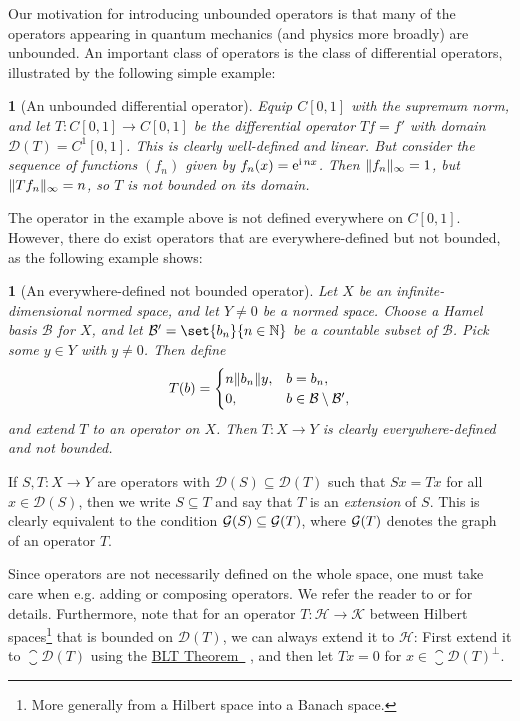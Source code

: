 \documentclass[article, a4paper, 11pt, oneside]{memoir}
\makeatletter
\numberwithin{equation}{chapter}
\newcommand{\calH}{\mathcal{H}}
\newcommand{\calK}{\mathcal{K}}
\newcommand{\calB}{\mathcal{B}}
\newcommand{\dom}{\mathcal{D}}
\theoremstyle{myexample}
\theoremstyle{myexample}
\theoremstyle{myexamplebreak}
\theoremstyle{myexamplebreak}
\newtheorem{examplebreak}[theorem]{\protect\@example}
\theoremstyle{nonumberplain}
\theoremstyle{MyNonumberplain}
\newcommand{\mynameref}[2]{%
    \hyperref[#1]{#2~\labelcref*{#1}}%
}
\newcommand{\@example}{}
\renewcommand{\@example}{Example}%
\renewcommand{\@example}{Eksempel}%
\makeatother
\begin{document}
Our motivation for introducing unbounded operators is that many of the operators appearing in quantum mechanics (and physics more broadly) are unbounded. An important class of operators is the class of differential operators, illustrated by the following simple example:
%
\begin{examplebreak}[An unbounded differential operator]
    Equip $C[0,1]$ with the supremum norm, and let $T \colon C[0,1] \to C[0,1]$ be the differential operator $Tf = f'$ with domain $\dom(T) = C^1[0,1]$. This is clearly well-defined and linear. But consider the sequence of functions $(f_n)$ given by $f_n(x) = \operatorname{\mathrm{e}}^{\operatorname{i} nx}$. Then $\lVert f_n\rVert_\infty = 1$, but $\lVert Tf_n\rVert_\infty = n$, so $T$ is not bounded on its domain.
\end{examplebreak}
%
The operator in the example above is not defined everywhere on $C[0,1]$. However, there do exist operators that are everywhere-defined but not bounded, as the following example shows:
%
\begin{examplebreak}[An everywhere-defined not bounded operator]
    Let $X$ be an infinite-dimensional normed space, and let $Y \neq 0$ be a normed space. Choose a Hamel basis $\calB$ for $X$, and let $\calB' = \set{b_n}{n \in \setN}$ be a countable subset of $\calB$. Pick some $y \in Y$ with $y \neq 0$. Then define
    \begin{equation*}
        T(b) =
        \begin{cases}
            n \norm{b_n} y, & b = b_n, \\
            0, & b \in \calB \setminus \calB',
        \end{cases}
    \end{equation*}
    and extend $T$ to an operator on $X$. Then $T \colon X \to Y$ is clearly everywhere-defined and not bounded.
\end{examplebreak}

If $S,T \colon X \to Y$ are operators with $\dom(S) \subseteq \dom(T)$ such that $Sx = Tx$ for all $x \in \dom(S)$, then we write $S \subseteq T$ and say that $T$ is an \emph{extension} of $S$. This is clearly equivalent to the condition $\mathcal{G}(S) \subseteq \mathcal{G}(T)$, where $\mathcal{G}(T)$ denotes the graph of an operator $T$.

Since operators are not necessarily defined on the whole space, one must take care when e.g. adding or composing operators. We refer the reader to \textcite[Definitions~13.1]{rudinfunctional} or \textcite[Section~1.1.1]{schmudgen2012} for details. Furthermore, note that for an operator $T \colon \calH \to \calK$ between Hilbert spaces\footnote{More generally from a Hilbert space into a Banach space.} that is bounded on $\dom(T)$, we can always extend it to $\calH$: First extend it to $\closure{\dom(T)}$ using the \mynameref{thm:blt}{BLT Theorem}, and then let $Tx = 0$ for $x \in \closure{\dom(T)}^\perp$.
\end{document}
